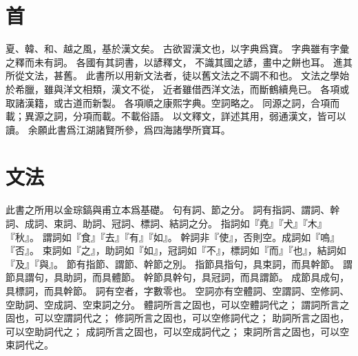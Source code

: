 \chapter*{首}
夏、韓、和、越之風，基於漢文矣。
古欲習漢文也，以字典爲寶。
字典雖有字彙之釋而未有詞。
各國有其詞書，以諺釋文，
不識其國之諺，畫中之餅也耳。
進其所從文法，甚舊。
此書所以用新文法者，徒以舊文法之不調不和也。
文法之學始於希臘，雖與洋文相類，漢文不從，
近者雖借西洋文法，而斷鶴續鳧已\parencite{Ahn:2012}。
各項或取諸漢籍，或古道而新製。
各項順之康熙字典。空詞略之。
同源之詞，合項而載；異源之詞，分項而載。不載俗語。
以文釋文，詳述其用，弱通漢文，皆可以讀。
余願此書爲江湖諸賢所參，爲四海諸學所寶耳。
\chapter*{文法}
此書之所用以金琮鎬與甫立本爲基礎。
句有詞、節之分。
詞有指詞、謂詞、幹詞、成詞、束詞、助詞、冠詞、標詞、結詞之分\parencites[43-4]{Pulleyblank:2005}[2-35]{Kim:2019}。
指詞如『堯』『犬』『木』『秋』。
謂詞如『食』『去』『有』『如』。
幹詞非『使』，否則空。成詞如『嗚』『否』。
束詞如『之』，助詞如『如』，冠詞如『不』，標詞如『而』『也』，結詞如『及』『與』。
節有指節、謂節、幹節之別\parencite[15]{Kim:2019}。
指節具指句，具束詞，而具幹節。
謂節具謂句，具助詞，而具體節。
幹節具幹句，具冠詞，而具謂節。
成節具成句，具標詞，而具幹節。
詞有空者，字數零也\parencite[2]{Kim:2019}。
空詞亦有空體詞、空謂詞、空修詞、空助詞、空成詞、空束詞之分。
體詞所言之固也，可以空體詞代之；
謂詞所言之固也，可以空謂詞代之；
修詞所言之固也，可以空修詞代之；
助詞所言之固也，可以空助詞代之；
成詞所言之固也，可以空成詞代之；
束詞所言之固也，可以空束詞代之。

